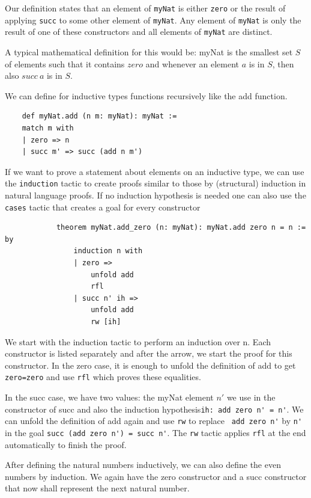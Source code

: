 Our definition states that an element of \lstinline|myNat| is either \lstinline|zero| or the result of applying \lstinline|succ| to some other element of \lstinline|myNat|. Any element of \lstinline|myNat| is only the result of one of these constructors and all elements of \lstinline|myNat| are distinct.

A typical mathematical definition for this would be: myNat is the smallest set $S$ of elements such that it contains $zero$ and whenever an element $a$ is in $S$, then also $succ\ a$ is in $S$.

We can define for inductive types functions recursively like the add function.

\begin{lstlisting}
    def myNat.add (n m: myNat): myNat :=
    match m with
    | zero => n
    | succ m' => succ (add n m')
\end{lstlisting}

If we want to prove a statement about elements on an inductive type, we can use the \lstinline|induction| tactic to create proofs similar to those by (structural) induction in natural language proofs. If no induction hypothesis is needed one can also use the \lstinline|cases| tactic that creates a goal for every constructor

\begin{lstlisting}
            theorem myNat.add_zero (n: myNat): myNat.add zero n = n := by
                induction n with
                | zero =>
                    unfold add
                    rfl
                | succ n' ih =>
                    unfold add
                    rw [ih]
\end{lstlisting}

We start with the induction tactic to perform an induction over n. Each constructor is listed separately and after the arrow, we start the proof for this constructor. In the zero case, it is enough to unfold the definition of add to get \lstinline|zero=zero| and use \lstinline|rfl| which proves these equalities.

In the succ case, we have two values:  the myNat element $n'$ we use in the constructor of succ and also the induction hypothesis\lstinline|ih: add zero n' = n'|. We can unfold the definition of add again and use \lstinline|rw| to replace \lstinline| add zero n'| by \lstinline|n'| in the goal \lstinline|succ (add zero n') = succ n'|. The \lstinline|rw| tactic applies \lstinline|rfl| at the end automatically to finish the proof.

After defining the natural numbers inductively, we can also define the even numbers by induction. We again have the zero constructor and a succ constructor that now shall represent the next natural number.

